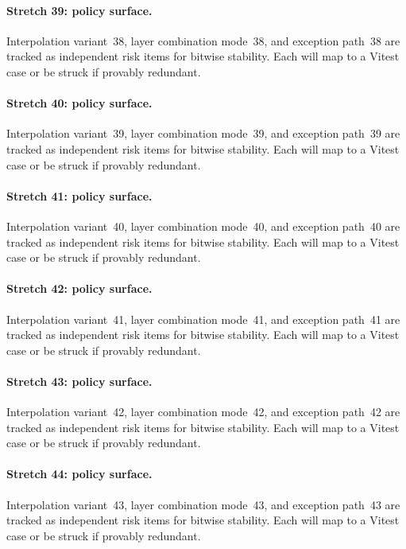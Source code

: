 \documentclass[sigconf,nonacm]{acmart}
\begin{document}
\paragraph{Stretch 39: policy surface.}
Interpolation variant~38, layer combination mode~38, and exception path~38 are tracked as independent risk items for bitwise stability. Each will map to a Vitest case or be struck if provably redundant. %

\paragraph{Stretch 40: policy surface.}
Interpolation variant~39, layer combination mode~39, and exception path~39 are tracked as independent risk items for bitwise stability. Each will map to a Vitest case or be struck if provably redundant. %

\paragraph{Stretch 41: policy surface.}
Interpolation variant~40, layer combination mode~40, and exception path~40 are tracked as independent risk items for bitwise stability. Each will map to a Vitest case or be struck if provably redundant. %

\paragraph{Stretch 42: policy surface.}
Interpolation variant~41, layer combination mode~41, and exception path~41 are tracked as independent risk items for bitwise stability. Each will map to a Vitest case or be struck if provably redundant. %

\paragraph{Stretch 43: policy surface.}
Interpolation variant~42, layer combination mode~42, and exception path~42 are tracked as independent risk items for bitwise stability. Each will map to a Vitest case or be struck if provably redundant. %

\paragraph{Stretch 44: policy surface.}
Interpolation variant~43, layer combination mode~43, and exception path~43 are tracked as independent risk items for bitwise stability. Each will map to a Vitest case or be struck if provably redundant. %
\end{document}
